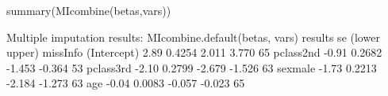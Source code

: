 \begin{Schunk}
\begin{Sinput}
 summary(MIcombine(betas,vars))
\end{Sinput}
\begin{Soutput}
Multiple imputation results:
      MIcombine.default(betas, vars)
            results     se (lower upper) missInfo
(Intercept)    2.89 0.4254  2.011  3.770     65 %
pclass2nd     -0.91 0.2682 -1.453 -0.364     53 %
pclass3rd     -2.10 0.2799 -2.679 -1.526     63 %
sexmale       -1.73 0.2213 -2.184 -1.273     63 %
age           -0.04 0.0083 -0.057 -0.023     65 %
\end{Soutput}
\end{Schunk}
